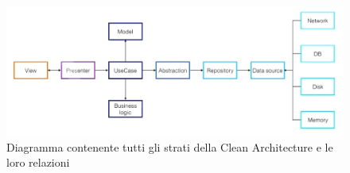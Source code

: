 \begin{figure}
  \includegraphics[width=\linewidth]{images/CleanArchitectureFlowWhite.png}
  \caption{Diagramma contenente tutti gli strati della Clean Architecture e le loro relazioni}
  \label{fig: clean-architecture-flow-white}
\end{figure}

